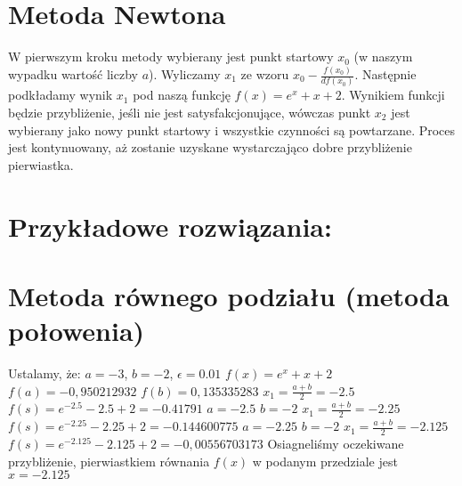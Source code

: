 \documentclass[11pt]{article}
\begin{document}
\section*{Metoda Newtona}
W pierwszym kroku metody wybierany jest punkt startowy $x_{0}$ (w naszym wypadku wartość liczby $a$). Wyliczamy $x_{1}$ ze wzoru $x_{0} - \frac{f(x_{0})}{df(x_{0})}$. Następnie podkładamy wynik $x_{1}$ pod naszą funkcję $f(x) = e^x + x + 2$. Wynikiem funkcji będzie przybliżenie, jeśli nie jest satysfakcjonujące, wówczas punkt $x_{2}$ jest wybierany jako nowy punkt startowy i wszystkie czynności są powtarzane. Proces jest kontynuowany, aż zostanie uzyskane wystarczająco dobre przybliżenie pierwiastka.

\clearpage
\section{Przykładowe rozwiązania:} 
\section*{Metoda równego podziału (metoda połowenia)}
Ustalamy, że: $a = -3$, $b = -2$, $\epsilon = 0.01$\newline
$f(x) = e^x + x + 2$\newline
$f(a) = -0,950212932$\newline
$f(b) = 0,135335283$\newline
\newline
$x_{1} = \frac{a+b}{2} = -2.5$\newline
$f(s) = e^{-2.5} - 2.5 + 2 = -0.41791$\newline
$a = -2.5$\newline
$b = -2$\newline
$x_{1} = \frac{a+b}{2} = -2.25$\newline
$f(s) = e^{-2.25} - 2.25 + 2 = -0.144600775$\newline
$a = -2.25$\newline
$b = -2$\newline
$x_{1} = \frac{a+b}{2} = -2.125$\newline
$f(s) = e^{-2.125} - 2.125 + 2 = -0,00556703173$\newline
\newline
Osiagneliśmy oczekiwane przybliżenie, pierwiastkiem równania $f(x)$ w podanym przedziale jest $x =  -2.125$
\end{document}
